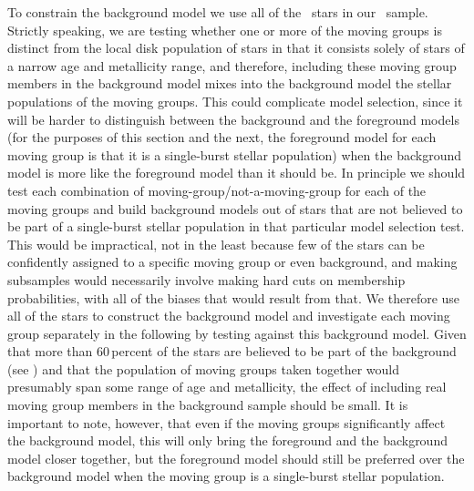 To constrain the background model we use all of the \nstarsms\ stars
in our \Hipparcos\ sample. Strictly speaking, we are testing whether
one or more of the moving groups is distinct from the local disk
population of stars in that it consists solely of stars of a narrow
age and metallicity range, and therefore, including these moving group
members in the background model mixes into the background model the
stellar populations of the moving groups. This could complicate model
selection, since it will be harder to distinguish between the
background and the foreground models (for the purposes of this section
and the next, the foreground model for each moving group is that it is
a single-burst stellar population) when the background model is more
like the foreground model than it should be. In principle we should
test each combination of moving-group/not-a-moving-group for each of
the moving groups and build background models out of stars that are
not believed to be part of a single-burst stellar population in that
particular model selection test. This would be impractical, not in the
least because few of the stars can be confidently assigned to a
specific moving group or even background, and making subsamples would
necessarily involve making hard cuts on membership probabilities, with
all of the biases that would result from that. We therefore use all of
the stars to construct the background model and investigate each
moving group separately in the following by testing against this
background model. Given that more than 60\,percent of the stars are
believed to be part of the background (see \bhr) and that the
population of moving groups taken together would presumably span some
range of age and metallicity, the effect of including real moving
group members in the background sample should be small. It is
important to note, however, that even if the moving groups
significantly affect the background model, this will only bring the
foreground and the background model closer together, but the
foreground model should still be preferred over the background model
when the moving group is a single-burst stellar population.

